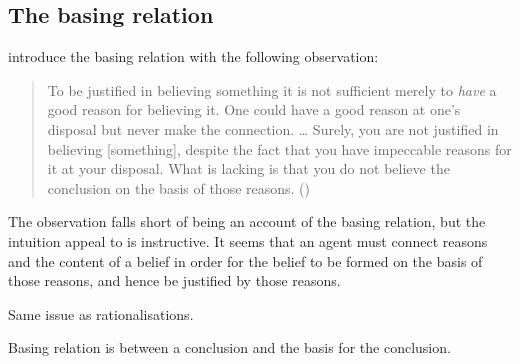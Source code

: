 \subsection*{The basing relation}

\begin{note}
  \citeauthor{Pollock:1999tm} introduce the basing relation with the following observation:
  \begin{quote}
    To be justified in believing something it is not sufficient merely to \emph{have} a good reason for believing it.
    One could have a good reason at one's disposal but never make the connection.
    \dots
    Surely, you are not justified in believing [something], despite the fact that you have impeccable reasons for it at your disposal.
    What is lacking is that you do not believe the conclusion on the basis of those reasons.%
    \mbox{}\hfill\mbox{(\citeyear[35]{Pollock:1999tm})}
  \end{quote}
  The observation falls short of being an account of the basing relation, but the intuition \citeauthor{Pollock:1999tm} appeal to is instructive.
  It seems that an agent must connect reasons and the content of a belief in order for the belief to be formed on the basis of those reasons, and hence be justified by those reasons.
\end{note}

\begin{note}
  Same issue as rationalisations.

  Basing relation is between a conclusion and the basis for the conclusion.
\end{note}

